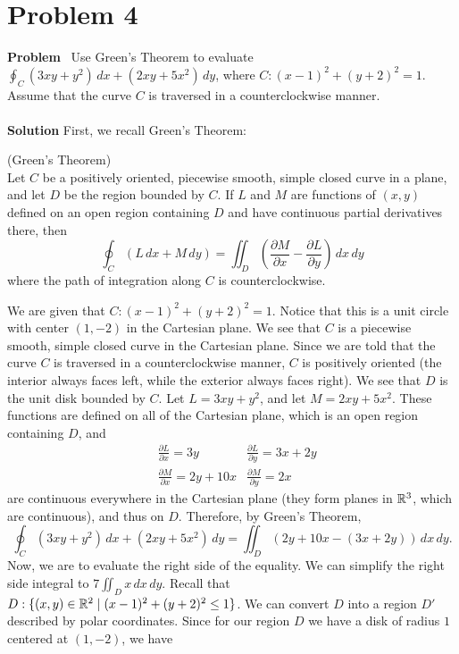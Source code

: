 \section{Problem 4}
\edef\sectionheader{February 16}

\noindent \textbf{Problem} \ Use Green’s Theorem to evaluate $\oint _C (3xy + y^2) \,dx + (2xy + 5x^2) \,dy$, where $C: (x - 1)^2 + (y + 2)^2 = 1$. Assume that the curve $C$ is traversed in a counterclockwise manner.
\\\\
\noindent \textbf{Solution} First, we  recall Green's Theorem:
\begin{definition} (Green's Theorem)
\\
Let $C$ be a positively oriented, piecewise smooth, simple closed curve in a plane, and let $D$ be the region bounded by $C$. If $L$ and $M$ are functions of $(x,y)$ defined on an open region containing $D$ and have continuous partial derivatives there, then \[\oint_C (L\,dx + M\,dy) = \iint_D \left(\frac{\partial M}{\partial x} - \frac{\partial L}{\partial y}\right)\,dx\,dy\] where the path of integration along $C$ is counterclockwise.
\end{definition}
We are given that $C: (x - 1)^2 + (y + 2)^2 = 1$. Notice that this is a unit circle with center $(1,-2)$ in the Cartesian plane. We see that $C$ is a piecewise smooth, simple closed curve in the Cartesian plane. Since we are told that the curve $C$ is traversed in a counterclockwise manner, $C$ is positively oriented (the interior always faces left, while the exterior always faces right). We see that $D$ is the unit disk bounded by $C$. Let $L = 3xy + y^2$, and let $M = 2xy + 5x^2$. These functions are defined on all of the Cartesian plane, which is an open region containing $D$, and
\begin{align*}
    & \frac{\partial L}{\partial x} = 3y & \frac{\partial L}{\partial y} = 3x + 2y \\
    & \frac{\partial M}{\partial x} = 2y + 10x & \frac{\partial M}{\partial y} = 2x
\end{align*}
are continuous everywhere in the Cartesian plane (they form planes in $\mathbb{R}^3$, which are continuous), and thus on $D$. Therefore, by Green's Theorem, \[\oint_C (3xy + y^2)\,dx + (2xy + 5x^2)\,dy = \iint_D \left( 2y + 10x - (3x + 2y) \right)\,dx\,dy.\] Now, we are to evaluate the right side of the equality. We can simplify the right side integral to $7\iint_D x \,dx\,dy$. Recall that $D: \{(x,y) \in \mathbb{R}^2 \mid (x - 1)^2 + (y + 2)^2 \leq 1\}$. We can convert $D$ into a region $D'$ described by polar coordinates. Since for our region $D$ we have a disk of radius $1$ centered at $(1,-2)$, we have
